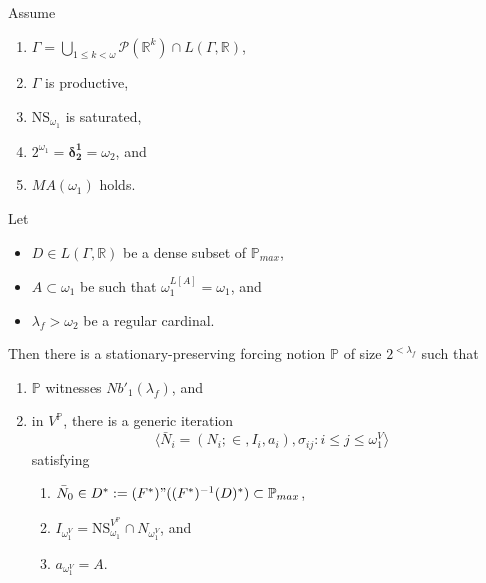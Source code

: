\documentclass[12pt]{article}
\numberwithin{equation}{section}
\begin{document}
\begin{thm}\label{notion2}
Assume
\begin{enumerate}[label=(\roman*), leftmargin=40pt]
    \item\label{h1} $\Gamma  = \bigcup_{1 \leq k < \omega} \mathcal{P}(\mathbb{R}^{k}) \cap L(\Gamma, \mathbb{R})$,
    \item\label{h2} $\Gamma$ is productive,
    \item\label{h3} $\mathrm{NS}_{\omega_1}$ is saturated,
    \item\label{h4} $2^{\omega_1} = \mathbf{\delta^1_2} = \omega_2$, and
    \item\label{h5} $MA(\omega_1)$ holds.
\end{enumerate}
Let 
\begin{itemize}
    \item $D \in L(\Gamma, \mathbb{R})$ be a dense subset of $\mathbb{P}_{max}$,
    \item $A \subset \omega_1$ be such that $\omega_1^{L[A]} = \omega_1$, and
    \item $\lambda_f > \omega_2$ be a regular cardinal.
\end{itemize}
Then there is a stationary-preserving forcing notion $\mathbb{P}$ of size $2^{< \lambda_f}$ such that 
\begin{enumerate}[label=(\alph*)]
    \item $\mathbb{P}$ witnesses $Nb'_1(\lambda_f)$, and
    \item in $V^{\mathbb{P}}$, there is a generic iteration $$\langle \bar{N}_i = (N_i; \in, I_i, a_i), \sigma_{ij} : i \leq j \leq \omega_1^V \rangle$$ satisfying 
    \begin{enumerate}[label=(\arabic*), leftmargin=40pt]
        \item\label{nov1} $\bar{N}_0 \in D^* := (F^*) " ((F^*)^{-1}(D)^*) \subset \mathbb{P}_{max}$,
        \item\label{nov2} $I_{\omega_1^V} = \mathrm{NS}_{\omega_1}^{V^{\mathbb{P}}} \cap N_{\omega_1^V}$, and
        \item\label{nov3} $a_{\omega_1^V} = A$.
    \end{enumerate}
\end{enumerate}
\end{thm}
\end{document}
